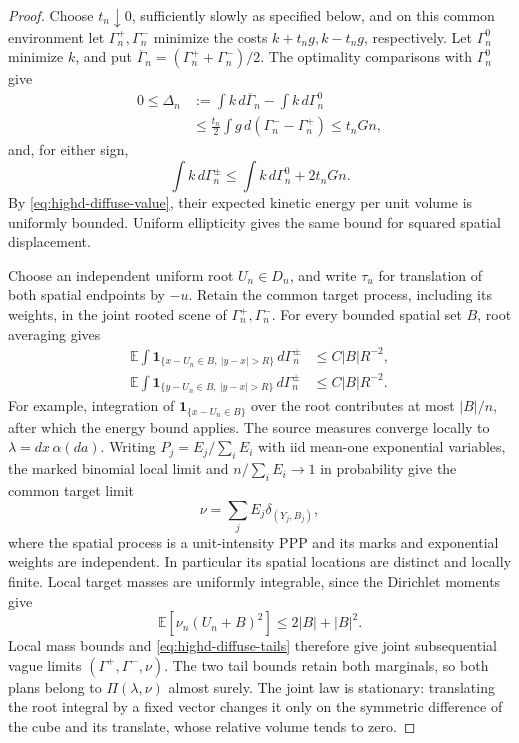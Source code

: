 \documentclass[11pt,reqno]{amsart}
\theoremstyle{definition}
\theoremstyle{remark}
\numberwithin{equation}{section}
\newcommand{\E}{\mathbb E}
\begin{document}
\begin{proof}
Choose \(t_n\downarrow0\), sufficiently slowly as specified below,
and on this common environment let \(\Gamma_n^+,\Gamma_n^-\)
minimize the costs \(k+t_ng,k-t_ng\), respectively. Let
\(\Gamma_n^0\) minimize \(k\), and put
\(\overline\Gamma_n=(\Gamma_n^++\Gamma_n^-)/2\).
The optimality comparisons with \(\Gamma_n^0\) give
\begin{equation}
 \begin{split}
 0\le\Delta_n
   &:=\int k\,d\overline\Gamma_n-\int k\,d\Gamma_n^0\\
   &\le\frac{t_n}{2}\int g\,d(\Gamma_n^--\Gamma_n^+)
    \le t_nGn,
 \end{split}
 \label{eq:highd-diffuse-excess}
\end{equation}
and, for either sign,
\[
 \int k\,d\Gamma_n^\pm
    \le\int k\,d\Gamma_n^0+2t_nGn.
\]
By \eqref{eq:highd-diffuse-value}, their expected kinetic energy
per unit volume is uniformly bounded. Uniform ellipticity gives the
same bound for squared spatial displacement.

Choose an independent uniform root \(U_n\in D_n\), and write
\(\tau_u\) for translation of both spatial endpoints by \(-u\).
Retain the common target process, including its weights, in the
joint rooted scene of \(\Gamma_n^+,\Gamma_n^-\). For every bounded
spatial set \(B\), root averaging gives
\begin{equation}
 \begin{split}
 \E\int\mathbf1_{\{x-U_n\in B,\ |y-x|>R\}}\,d\Gamma_n^\pm
   &\le C|B|R^{-2},\\
 \E\int\mathbf1_{\{y-U_n\in B,\ |y-x|>R\}}\,d\Gamma_n^\pm
   &\le C|B|R^{-2}.
 \end{split}
 \label{eq:highd-diffuse-tails}
\end{equation}
For example, integration of \(\mathbf1_{\{x-U_n\in B\}}\)
over the root contributes at most \(|B|/n\), after which the
energy bound applies. The source measures converge locally to
\(\lambda=dx\,\alpha(da)\).
Writing \(P_j=E_j/\sum_iE_i\) with iid mean-one exponential
variables, the marked binomial local limit and
\(n/\sum_iE_i\to1\) in probability give the common target limit
\[
 \nu=\sum_j E_j\delta_{(Y_j,B_j)},
\]
where the spatial process is a unit-intensity PPP and its marks and
exponential weights are independent. In particular its spatial
locations are distinct and locally finite. Local target masses are
uniformly integrable, since the Dirichlet moments give
\[
 \E[\nu_n(U_n+B)^2]\le2|B|+|B|^2.
\]
Local mass bounds and \eqref{eq:highd-diffuse-tails} therefore give
joint subsequential vague limits \((\Gamma^+,\Gamma^-,\nu)\).
The two tail bounds retain both marginals, so both plans belong to
\(\Pi(\lambda,\nu)\) almost surely. The joint law is stationary:
translating the root integral by a fixed vector changes it only on
the symmetric difference of the cube and its translate, whose
relative volume tends to zero.


\end{proof}
\end{document}
